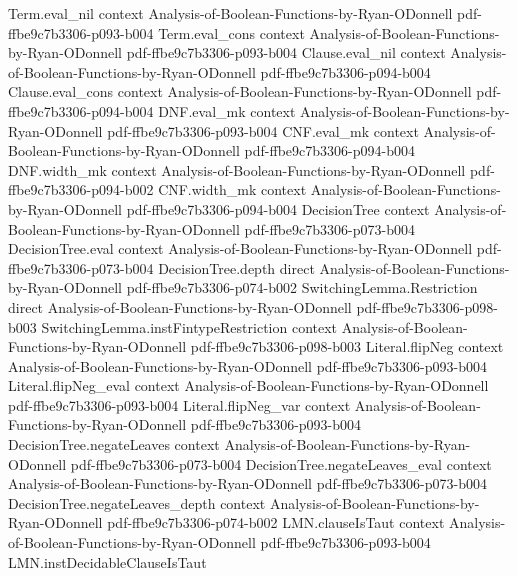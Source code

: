 \begin{lemma}
\proofstep
  {Term.eval_nil}
  {context}
  {Analysis-of-Boolean-Functions-by-Ryan-ODonnell}
  {pdf-ffbe9c7b3306-p093-b004}
\proofstep
  {Term.eval_cons}
  {context}
  {Analysis-of-Boolean-Functions-by-Ryan-ODonnell}
  {pdf-ffbe9c7b3306-p093-b004}
\proofstep
  {Clause.eval_nil}
  {context}
  {Analysis-of-Boolean-Functions-by-Ryan-ODonnell}
  {pdf-ffbe9c7b3306-p094-b004}
\proofstep
  {Clause.eval_cons}
  {context}
  {Analysis-of-Boolean-Functions-by-Ryan-ODonnell}
  {pdf-ffbe9c7b3306-p094-b004}
\proofstep
  {DNF.eval_mk}
  {context}
  {Analysis-of-Boolean-Functions-by-Ryan-ODonnell}
  {pdf-ffbe9c7b3306-p093-b004}
\proofstep
  {CNF.eval_mk}
  {context}
  {Analysis-of-Boolean-Functions-by-Ryan-ODonnell}
  {pdf-ffbe9c7b3306-p094-b004}
\proofstep
  {DNF.width_mk}
  {context}
  {Analysis-of-Boolean-Functions-by-Ryan-ODonnell}
  {pdf-ffbe9c7b3306-p094-b002}
\proofstep
  {CNF.width_mk}
  {context}
  {Analysis-of-Boolean-Functions-by-Ryan-ODonnell}
  {pdf-ffbe9c7b3306-p094-b004}
\proofstep
  {DecisionTree}
  {context}
  {Analysis-of-Boolean-Functions-by-Ryan-ODonnell}
  {pdf-ffbe9c7b3306-p073-b004}
\proofstep
  {DecisionTree.eval}
  {context}
  {Analysis-of-Boolean-Functions-by-Ryan-ODonnell}
  {pdf-ffbe9c7b3306-p073-b004}
\proofstep
  {DecisionTree.depth}
  {direct}
  {Analysis-of-Boolean-Functions-by-Ryan-ODonnell}
  {pdf-ffbe9c7b3306-p074-b002}
\proofstep
  {SwitchingLemma.Restriction}
  {direct}
  {Analysis-of-Boolean-Functions-by-Ryan-ODonnell}
  {pdf-ffbe9c7b3306-p098-b003}
\proofstep
  {SwitchingLemma.instFintypeRestriction}
  {context}
  {Analysis-of-Boolean-Functions-by-Ryan-ODonnell}
  {pdf-ffbe9c7b3306-p098-b003}
\proofstep
  {Literal.flipNeg}
  {context}
  {Analysis-of-Boolean-Functions-by-Ryan-ODonnell}
  {pdf-ffbe9c7b3306-p093-b004}
\proofstep
  {Literal.flipNeg_eval}
  {context}
  {Analysis-of-Boolean-Functions-by-Ryan-ODonnell}
  {pdf-ffbe9c7b3306-p093-b004}
\proofstep
  {Literal.flipNeg_var}
  {context}
  {Analysis-of-Boolean-Functions-by-Ryan-ODonnell}
  {pdf-ffbe9c7b3306-p093-b004}
\proofstep
  {DecisionTree.negateLeaves}
  {context}
  {Analysis-of-Boolean-Functions-by-Ryan-ODonnell}
  {pdf-ffbe9c7b3306-p073-b004}
\proofstep
  {DecisionTree.negateLeaves_eval}
  {context}
  {Analysis-of-Boolean-Functions-by-Ryan-ODonnell}
  {pdf-ffbe9c7b3306-p073-b004}
\proofstep
  {DecisionTree.negateLeaves_depth}
  {context}
  {Analysis-of-Boolean-Functions-by-Ryan-ODonnell}
  {pdf-ffbe9c7b3306-p074-b002}
\proofstep
  {LMN.clauseIsTaut}
  {context}
  {Analysis-of-Boolean-Functions-by-Ryan-ODonnell}
  {pdf-ffbe9c7b3306-p093-b004}
\proofstep
  {LMN.instDecidableClauseIsTaut}

\end{lemma}
